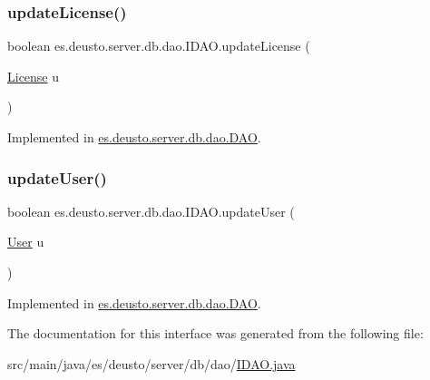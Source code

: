 \subsubsection{\texorpdfstring{update\+License()}{updateLicense()}}
{\footnotesize\ttfamily boolean es.\+deusto.\+server.\+db.\+dao.\+I\+D\+A\+O.\+update\+License (\begin{DoxyParamCaption}\item[{\hyperlink{classes_1_1deusto_1_1server_1_1db_1_1data_1_1_license}{License}}]{u }\end{DoxyParamCaption})}



Implemented in \hyperlink{classes_1_1deusto_1_1server_1_1db_1_1dao_1_1_d_a_o_a98774e8d93cdd4d8d104a197bd37d4e1}{es.\+deusto.\+server.\+db.\+dao.\+D\+AO}.

\mbox{\label{interfacees_1_1deusto_1_1server_1_1db_1_1dao_1_1_i_d_a_o_a790b00e2989b634c1bbb2c6620ff3583}} 
\subsubsection{\texorpdfstring{update\+User()}{updateUser()}}
{\footnotesize\ttfamily boolean es.\+deusto.\+server.\+db.\+dao.\+I\+D\+A\+O.\+update\+User (\begin{DoxyParamCaption}\item[{\hyperlink{classes_1_1deusto_1_1server_1_1db_1_1data_1_1_user}{User}}]{u }\end{DoxyParamCaption})}



Implemented in \hyperlink{classes_1_1deusto_1_1server_1_1db_1_1dao_1_1_d_a_o_a7f6ed77294fe1f61cbebbea410cef6e0}{es.\+deusto.\+server.\+db.\+dao.\+D\+AO}.



The documentation for this interface was generated from the following file\+:\begin{DoxyCompactItemize}
\item 
src/main/java/es/deusto/server/db/dao/\hyperlink{_i_d_a_o_8java}{I\+D\+A\+O.\+java}\end{DoxyCompactItemize}
